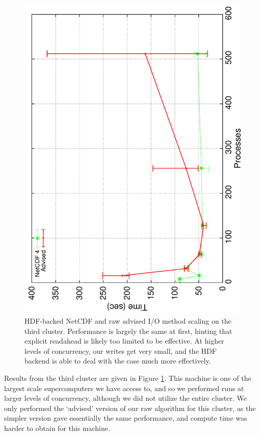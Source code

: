 \begin{figure}
  \centering
  \includegraphics[angle=270,width=\linewidth]{images/io/jaguar-most}
  \caption{HDF-backed NetCDF and raw advised I/O method scaling on the
  third cluster.  Performance is largely the same at first, hinting
  that explicit readahead is likely too limited to be effective.  At
  higher levels of concurrency, our writes get very small, and the HDF
  backend is able to deal with the case much more effectively.}
  \label{fig:jaguar-most}
\end{figure}

Results from the third cluster are given in Figure
\ref{fig:jaguar-most}.  This machine is one of the largest scale
supercomputers we have access to, and so we performed runs at larger
levels of concurrency, although we did not utilize the entire cluster.
We only performed the `advised' version of our raw algorithm for this
cluster, as the simpler version gave essentially the same performance,
and compute time was harder to obtain for this machine.

